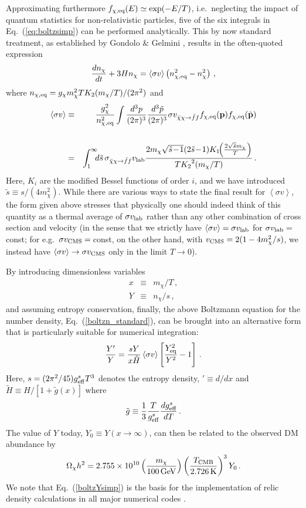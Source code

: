 \documentclass[twocolumn,showpacs,amsmath,amssymb,superscriptaddress,nofootinbib]{revtex4-1}
\newcommand{\be}{\begin{equation}}
\newcommand{\ee}{\end{equation}}
\newcommand{\bea}{\begin{eqnarray}}
\newcommand{\eea}{\end{eqnarray}}
\begin{document}
Approximating furthermore $f_{\chi,{\rm eq}}(E)\simeq \exp(-E/T)$, i.e.~neglecting the impact of 
quantum statistics for non-relativistic particles, five of the six integrals in Eq.~(\ref{eq:boltzsimp}) 
can be performed analytically. This by now standard treatment, as established
by Gondolo \& Gelmini \cite{Gondolo:1990dk}, results in the often-quoted expression 
\be
\label{boltzn_standard}
\frac{dn_\chi}{dt}+3Hn_\chi= \langle \sigma v\rangle\left(n_{\chi,{\rm eq}}^2 -n_\chi^2\right)\,,
\ee
where $n_{\chi,{\rm eq}}= g_\chi m_\chi^2 T K_2(m_\chi/T)/(2\pi^2)$ and
\bea
\label{therm_av1}
 \left\langle \sigma v\right\rangle
 &\equiv&
\frac{g_\chi^2}{n_{\chi,{\rm eq}}^2}
\int \frac{d^3p}{(2\pi)^3} \frac{d^3\tilde p}{(2\pi)^3} 
 \sigma v_{\bar\chi\chi\rightarrow \bar f f} 
f_{\chi,{\rm eq}}(\mathbf{p}) f_{\chi,{\rm eq}}(\tilde{\mathbf{p}})
\nonumber\\
\\
 &=&  \int_1^\infty\!\!\! d\tilde s\, \sigma_{\bar\chi\chi\rightarrow \bar f f}v_{\rm lab}
 \frac{  2m_\chi \sqrt{\tilde s\!-\!1}(2\tilde s\!-\!1)K_1\!\!\left(\frac{2{\sqrt{\tilde s}} m_\chi}{T}\right)}
 {{T K_2}^2(m_\chi/T)}\,.\label{therm_av1eq} \nonumber\\
\eea
Here, $K_i$ are the modified Bessel functions of order $i$, and we have introduced
$\tilde s\equiv s/(4m_\chi^2)$. While there are various ways to state the final result for
$\left\langle \sigma v\right\rangle$, the form given above stresses that physically 
one should indeed think of this quantity as a thermal average of $\sigma v_{\rm lab}$ rather than any other
combination of cross section and velocity
(in the sense that we strictly have 
$\left\langle \sigma v\right\rangle=\sigma v_{\rm lab}$ for $\sigma v_{\rm lab}=$\,const;
for e.g.~$\sigma v_{\rm CMS}=$\,const, on the other hand, with $v_{\rm CMS}=2(1-4m_\chi^2/s)$,  
we instead have $\left\langle \sigma v\right\rangle\to \sigma v_{\rm CMS}$  only 
in the limit $T\to0$).


By introducing dimensionless variables 
\bea
x&\equiv& m_\chi/T\,,\\
Y&\equiv& n_\chi/s\,,\label{Ydef}
\eea
and assuming entropy conservation, finally, the above Boltzmann equation for the 
number density, Eq.~(\ref{boltzn_standard}), can be brought into an alternative form 
that is particularly suitable for numerical integration:
\be
\label{boltzYsimp}
\frac{Y'}{Y}=\frac{sY}{x\tilde H}
\left\langle \sigma v\right\rangle
\left[
\frac{Y_{\rm eq}^2}{Y^2}-1
\right]\,.
\ee
Here, $s=(2\pi^2/45) g^s_{\rm{eff}}T^3$ denotes the entropy density, $'\equiv d/dx$ and 
$\tilde H\equiv H/\left[1+ \tilde g(x)\right]$ where
\be
\label{gtildedef}
\tilde g \equiv \frac{1}{3} \frac{T}{g^s_{\rm\text{eff}}}\frac{ d g^s_{\rm\text{eff}}}{d T} \,.
\ee
The value of $Y$ today, $Y_0\equiv Y(x\to \infty)$, can then be related to the observed DM 
abundance by \cite{Gondolo:1990dk}
\be
\label{eq:oh2}
\Omega_\chi h^2= 2.755\times10^{10}\left(\frac{m_\chi}{100\,{\rm GeV}}\right) \left(\frac{T_{\rm CMB}}{2.726\,{\rm K}}\right)^3Y_0\,.
\ee
We note that
Eq.~(\ref{boltzYsimp}) is the basis for the implementation of relic density 
calculations in all major numerical codes \cite{Belanger:2001fz,Gondolo:2004sc,Belanger:2006is,
Arbey:2009gu,Belanger:2013oya,ds6,Workgroup:2017lvb}.
\end{document}
